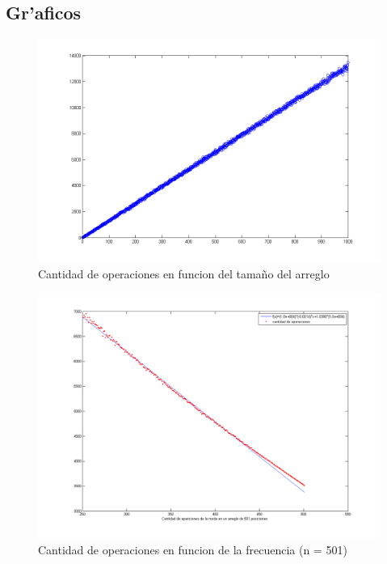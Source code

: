 \subsection{Gr'aficos}
\begin{figure}[H]
\centering
\includegraphics[scale=0.5]{../../codigo/ejercicio3/benchmark/graficos/corridas_aleatorias_n_creciente/grafico.png}
\caption{Cantidad de operaciones en funcion del tama\~{n}o del arreglo}
\end{figure}

\begin{figure}[H]
\centering
\includegraphics[scale=0.5]{../../codigo/ejercicio3/benchmark/graficos/frecuencia/frecuencia.png}
\caption{Cantidad de operaciones en funcion de la frecuencia (n = 501)}
\end{figure}

